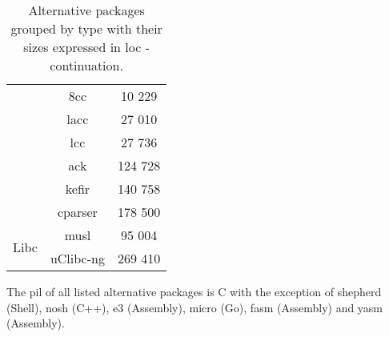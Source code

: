 \begin{table}[!ht]
\begin{tabular}{|c|c|c|}
        \cline{2-3}
        & 8cc \cite{8cc} & 10 229 \\
        \cline{2-3}
        & lacc \cite{lacc} & 27 010 \\
        \cline{2-3}
        & lcc \cite{lcc} \footnotemark[4] & 27 736 \\
        \cline{2-3}
        & ack \cite{ack} & 124 728 \\
        \cline{2-3}
        & kefir \cite{kefir} & 140 758 \\
        \cline{2-3}
        & cparser \cite{cparser} & 178 500 \\
        \hline
        \hline
        \multirow{2}{*}{Libc}
        & musl \cite{musl} & 95 004 \\
        \cline{2-3}
        & uClibc-ng \cite{uclibc-ng} & 269 410 \\
        \hline
    \end{tabular}
    \caption{Alternative packages grouped by type with their sizes expressed in \gls{loc} - continuation.}
\end{table}


The \gls{pil} of all listed alternative packages is C with the exception of shepherd (Shell), nosh (C++), e3 (Assembly), micro (Go), fasm (Assembly) and yasm (Assembly).

